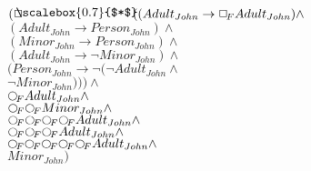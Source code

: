 \documentclass[a4paper,10pt]{article}
\begin{document}
 \newcommand{\nxt}{{\ensuremath\raisebox{0.25ex}{\text{\scriptsize$\bigcirc$}}}}
\newcommand{\Rdiamond}{\Diamond_{\!F}}
\newcommand{\Rbox}{\Box_{\!F}}
\newcommand{\Rnext}{\nxt_{\!F}}
\newcommand{\Ldiamond}{\Diamond_{\!P}}
\newcommand{\Lbox}{\Box_{\!P}}
\newcommand{\Lnext}{\nxt_{\!P}}
\newcommand{\SVdiamond}{\mathop{\ooalign{$\Diamond$ \cr \kern0.5ex
    \raisebox{0.35ex}{\scalebox{0.7}{$*$}}} \kern-0.9ex}}
\newcommand{\SVbox}{\mathop{\ooalign{$\Box$ \cr \kern0.42ex
    \raisebox{0.3ex}{\scalebox{0.7}{$*$}}} \kern-0.9ex}}


$( \SVbox ((Adult_{John} \rightarrow  \Rbox Adult_{John}) \land $ \\ 
 $ (Adult_{John} \rightarrow Person_{John}) \land $ \\ 
 $ (Minor_{John} \rightarrow Person_{John}) \land $ \\ 
 $ (Adult_{John} \rightarrow  \lnot Minor_{John}) \land $ \\ 
 $ (Person_{John} \rightarrow  \lnot ( \lnot Adult_{John} \land $ \\ 
 $  \lnot Minor_{John}))) \land $ \\ 
 $  \Rnext Adult_{John} \land $ \\ 
 $  \Rnext  \Rnext Minor_{John} \land $ \\ 
 $  \Rnext  \Rnext  \Rnext  \Rnext Adult_{John} \land $ \\ 
 $  \Rnext  \Rnext  \Rnext Adult_{John} \land $ \\ 
 $  \Rnext  \Rnext  \Rnext  \Rnext  \Rnext Adult_{John} \land $ \\ 
 $ Minor_{John})$ 
\end{document}
